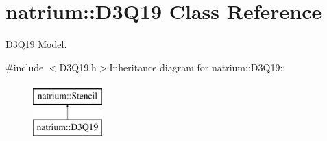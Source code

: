 \hypertarget{classnatrium_1_1D3Q19}{
\section{natrium::D3Q19 Class Reference}
\label{classnatrium_1_1D3Q19}
}


\hyperlink{classnatrium_1_1D3Q19}{D3Q19} Model.  


{\ttfamily \#include $<$D3Q19.h$>$}Inheritance diagram for natrium::D3Q19::\begin{figure}[H]
\begin{center}
\leavevmode
\includegraphics[height=2cm]{classnatrium_1_1D3Q19}
\end{center}
\end{figure}
